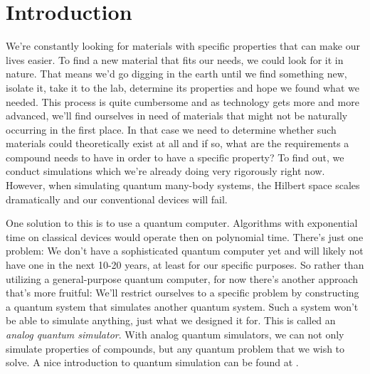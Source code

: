 \section{Introduction}
We're constantly looking for materials with specific properties that can make our lives easier. To find a new material that fits our needs, we could look for it in nature. That means we'd go digging in the earth until we find something new, isolate it, take it to the lab, determine its properties and hope we found what we needed. This process is quite cumbersome and as technology gets more and more advanced, we'll find ourselves in need of materials that might not be naturally occurring in the first place. In that case we need to determine whether such materials could theoretically exist at all and if so, what are the requirements a compound needs to have in order to have a specific property? To find out, we conduct simulations which we're already doing very rigorously right now. However, when simulating quantum many-body systems, the Hilbert space scales dramatically and our conventional devices will fail.

One solution to this is to use a quantum computer. Algorithms with exponential time on classical devices would operate then on polynomial time. There's just one problem: We don't have a sophisticated quantum computer yet and will likely not have one in the next 10-20 years, at least for our specific purposes. So rather than utilizing a general-purpose quantum computer, for now there's another approach that's more fruitful: We'll restrict ourselves to a specific problem by constructing a quantum system that simulates another quantum system. Such a system won't be able to simulate anything, just what we designed it for. This is called an \textit{analog quantum simulator}. With analog quantum simulators, we can not only simulate properties of compounds, but any quantum problem that we wish to solve. A nice introduction to quantum simulation can be found at \cite{quantum_sanchez}.

